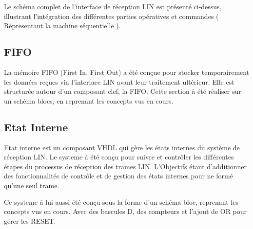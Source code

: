 Le schéma complet de l’interface de réception LIN est présenté ci-dessus, illustrant l’intégration des différentes parties opératives et commandes ( Répresentant la machine séquentielle ).
\newline

\subsection{FIFO}

La mémoire FIFO (First In, First Out) a été conçue pour stocker temporairement les données reçues via l’interface LIN avant leur traitement ultérieur.
Elle est structurée autour d'un composant clef, la FIFO.
Cette section à été réaliser sur un schéma blocs, en reprenant les concepts vus en cours.
\newline


\subsection{Etat Interne}

Etat interne est un composant VHDL qui gère les états internes du système de réception LIN. 
Le systeme à été conçu pour suivre et contrôler les différentes étapes du processus de réception des trames LIN.
L'Objectifs étant d'additionner des fonctionnalités de contrôle et de gestion des états internes pour ne formé qu'une seul trame.
\newline

Ce systeme à lui aussi été conçu sous la forme d'un schéma bloc, reprenant les concepts vus en cours. Avec des bascules D, des compteurs et l'ajout de OR pour gérer les RESET.
\newline

